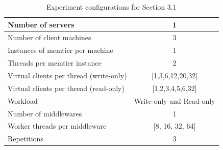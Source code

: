 \documentclass[11pt,a4paper]{article}
\begin{document}
\begin{table}[H]
    \centering
	\begin{tabular}{|l|c|}
		\hline Number of servers                & 1                        \\ 
		\hline Number of client machines        & 3                        \\ 
		\hline Instances of memtier per machine & 1                        \\ 
		\hline Threads per memtier instance     & 2                        \\
		\hline Virtual clients per thread (write-only)  & [1,3,6,12,20,32] \\ 
		\hline Virtual clients per thread (read-only)   & [1,2,3,4,5,6,32] \\ 
		\hline Workload                         & Write-only and Read-only \\
		\hline Number of middlewares            & 1                        \\
		\hline Worker threads per middleware    & [8, 16, 32, 64]          \\
		\hline Repetitions                      & 3                        \\ 
		\hline 
	\end{tabular}
	\caption{Experiment configurations for Section 3.1} \label{exp3-1}
\end{table}
\end{document}
